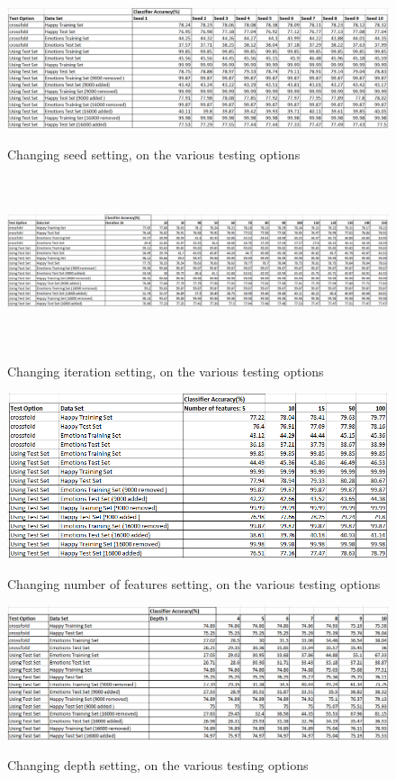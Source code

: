 \begin{figure}[hbt!]
	\centering
      \includegraphics[width=\textwidth]{imgs/RandomForest/RandomForest_Seed.png} \\
	\caption{Changing seed setting, on the various testing options}
	\label{fig:randomforest_seed}
\end{figure}
\begin{figure}[hbt!]
	\centering
      \includegraphics[width=\textwidth ,height=5cm]{imgs/RandomForest/RandomForest_Iteration.png} \\
	\caption{Changing iteration setting, on the various testing options}
	\label{fig:randomforest_iteration}
\end{figure}

\begin{figure}[hbt!]
	\centering
      \includegraphics[width=\textwidth]{imgs/RandomForest/RandomForest_NumOfFeatures.png} \\
	\caption{Changing number of features setting, on the various testing options}
	\label{fig:randomforest_numfeatures}
\end{figure}

\begin{figure}[hbt!]
	\centering
      \includegraphics[width=\textwidth]{imgs/RandomForest/RandomForest_Depth.png} \\
	\caption{Changing depth setting, on the various testing options}
	\label{fig:randomforest_numfeatures}
\end{figure}


